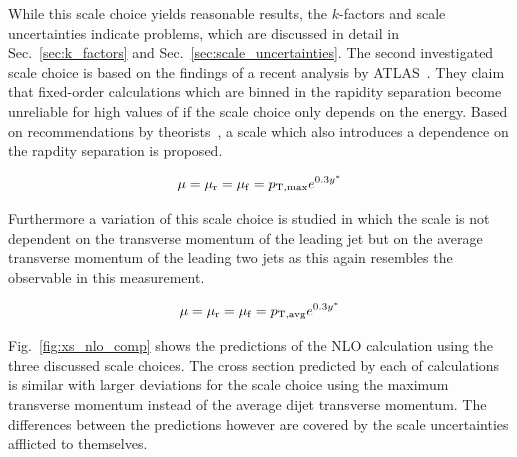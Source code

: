 While this scale choice yields reasonable results, the $k$-factors and scale
uncertainties indicate problems, which are discussed in detail
in Sec.~\ref{sec:k_factors} and Sec.~\ref{sec:scale_uncertainties}. The second investigated scale choice is based on the
findings of a recent analysis by ATLAS~\cite{Aad:2011fc}. They claim that
fixed-order calculations which are binned in the rapidity separation \ystar
become  unreliable for high values of
\ystar if the scale choice only depends on the energy. Based on recommendations
by theorists~\cite{Ellis:1992en}, a scale which also introduces a dependence on
the rapdity separation is proposed.

\begin{equation*}
    \mu = \mu_{\mathrm{r}} = \mu_{\mathrm{f}} = p_{\mathrm{T,max}} e^{0.3 y^*} 
\end{equation*}

Furthermore a variation of this scale choice is studied in which the scale is not
dependent on the transverse momentum of the leading jet but on the average
transverse momentum of the leading two jets as this again resembles the
observable in this measurement.

\begin{equation*}
    \mu = \mu_{\mathrm{r}} = \mu_{\mathrm{f}} = p_{\mathrm{T,avg}} e^{0.3 y^*} 
\end{equation*}

Fig.~\ref{fig:xs_nlo_comp} shows the predictions of the NLO calculation using
the three discussed scale choices. The cross section predicted by each of
calculations is similar with larger deviations for the scale choice using the
maximum transverse momentum instead of the average dijet transverse momentum.
The differences between the predictions however are covered by the scale uncertainties
afflicted to themselves.

